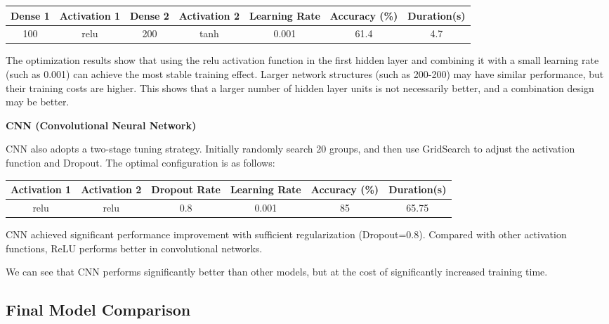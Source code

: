  \begin{table}[h]
\begin{tabular}{ccccccc}
\hline
Dense 1 &  Activation 1 & Dense 2 & Activation 2 & Learning Rate & Accuracy (\%) & Duration(s) 
\\
\hline
100     & relu     & 200         & tanh         & 0.001         & 61.4          & 4.7      \\
\hline
\end{tabular}
\end{table}

\noindent 

The optimization results show that using the relu activation function in the first hidden layer and combining it with a small learning rate (such as 0.001) can achieve the most stable training effect. Larger network structures (such as 200-200) may have similar performance, but their training costs are higher. This shows that a larger number of hidden layer units is not necessarily better, and a combination design may be better.

\bigskip

 \noindent\textbf{CNN (Convolutional Neural Network)}

 CNN also adopts a two-stage tuning strategy. Initially randomly search 20 groups, and then use GridSearch to adjust the activation function and Dropout. The optimal configuration is as follows:

 \begin{table}[h]
\begin{tabular}{cccccc}
\hline
Activation 1 & Activation 2 & Dropout Rate & Learning Rate & Accuracy (\%) & Duration(s) 
\\
\hline
relu     & relu         & 0.8         & 0.001         & 85          & 65.75      \\
\hline
\end{tabular}
\end{table}

\noindent

CNN achieved significant performance improvement with sufficient regularization (Dropout=0.8). Compared with other activation functions, ReLU performs better in convolutional networks. 

\noindent

We can see that CNN performs significantly better than other models, but at the cost of significantly increased training time.

\newpage

\subsection{Final Model Comparison}

